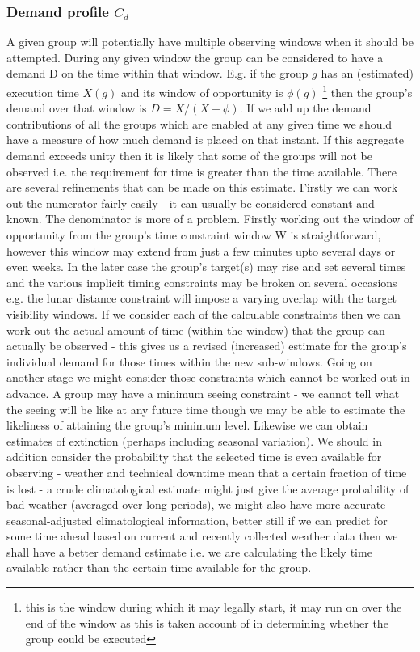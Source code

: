 \subsubsection{Demand profile $C_d$}
A given group will potentially have multiple observing windows when it should be attempted. During any given window the group can be considered to have a demand D on the time within that window. E.g. if the group $g$ has an (estimated) execution time $X(g)$ and its window of opportunity is $\phi(g)$ \footnote[1]{this is the window during which it may legally start, it may run on over the end of the window as this is taken account of in determining whether the group could be executed} then the group's demand over that window is $D=X/(X+\phi)$. If we add up the demand contributions of all the groups which are enabled at any given time we should have a measure of how much demand is placed on that instant. If this aggregate demand exceeds unity then it is likely that some of the groups will not be observed i.e. the requirement for time is greater than the time available. 
There are several refinements that can be made on this estimate. Firstly we can work out the numerator fairly easily - it can usually be considered constant and known. The denominator is more of a problem. Firstly working out the window of opportunity from the group's time constraint window \textsf{W} is straightforward, however this window may extend from just a few minutes upto several days or even weeks. In the later case the group's target(s) may rise and set several times and the various implicit timing constraints may be broken on several occasions e.g. the lunar distance constraint will impose a varying overlap with the target visibility windows. If we consider each of the calculable constraints then we can work out the actual amount of time (within the window) that the group can
actually be observed - this gives us a revised (increased) estimate for the group's individual demand for those times within the new sub-windows. 
Going on another stage we might consider those constraints which cannot be worked out in advance. A group may have a minimum seeing constraint - we cannot tell what the seeing will be like at any future time though we may be able to estimate the likeliness of attaining the group's minimum level. Likewise we can obtain estimates of extinction (perhaps including seasonal variation). We should in addition consider the probability that the selected time is even available for observing - weather and technical downtime mean that a certain fraction of time is lost - a crude climatological estimate might just give the average probability of bad weather (averaged over long periods), we might also have more accurate seasonal-adjusted climatological information, better still if we can predict for some time ahead based on current and recently collected weather data then we shall have a better demand estimate i.e. we are calculating the likely time available rather than the certain time available for the group.

